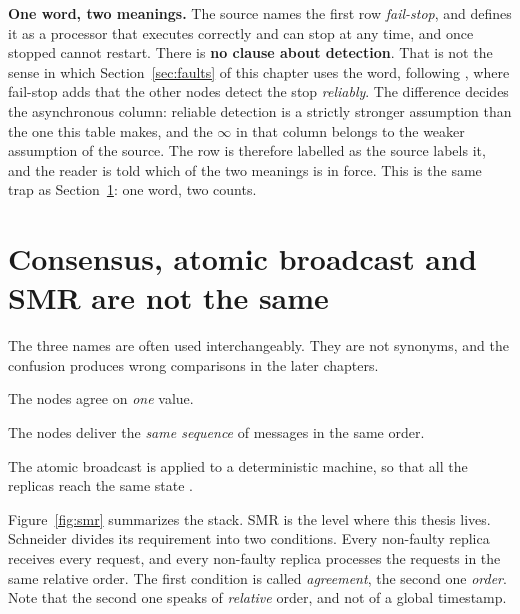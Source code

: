 \begin{table}[t]
\begin{minipage}{0.94\linewidth}
\smallskip
\textbf{One word, two meanings.} The source names the first row
\emph{fail-stop}, and defines it as a processor that executes correctly
and can stop at any time, and once stopped cannot restart. There is
\textbf{no clause about detection}. That is not the sense in which
Section~\ref{sec:faults} of this chapter uses the word, following
\cite{schneider1990implementing}, where fail-stop adds that the other
nodes detect the stop \emph{reliably}. The difference decides the
asynchronous column: reliable detection is a strictly stronger
assumption than the one this table makes, and the $\infty$ in that column
belongs to the weaker assumption of the source. The row is therefore
labelled as the source labels it, and the reader is told which of the
two meanings is in force. This is the same trap as
Section~\ref{sec:smr}: one word, two counts.
\end{minipage}
\end{table}

\section{Consensus, atomic broadcast and SMR are not the same}
\label{sec:smr}

The three names are often used interchangeably. They are not synonyms,
and the confusion produces wrong comparisons in the later chapters.

\begin{description}[leftmargin=2.2em,style=nextline,font=\normalfont\bfseries]
  \item[Consensus.] The nodes agree on \emph{one} value.
  \item[Atomic broadcast.] The nodes deliver the \emph{same sequence} of
  messages in the same order.
  \item[State machine replication (SMR).] The atomic broadcast is
  applied to a deterministic machine, so that all the replicas reach the
  same state \cite{schneider1990implementing}.
\end{description}

Figure~\ref{fig:smr} summarizes the stack. SMR is the level where this
thesis lives. Schneider divides its requirement into two conditions.
Every non-faulty replica receives every request, and every non-faulty
replica processes the requests in the same relative order. The first
condition is called \emph{agreement}, the second one \emph{order}. Note
that the second one speaks of \emph{relative} order, and not of a global
timestamp.

